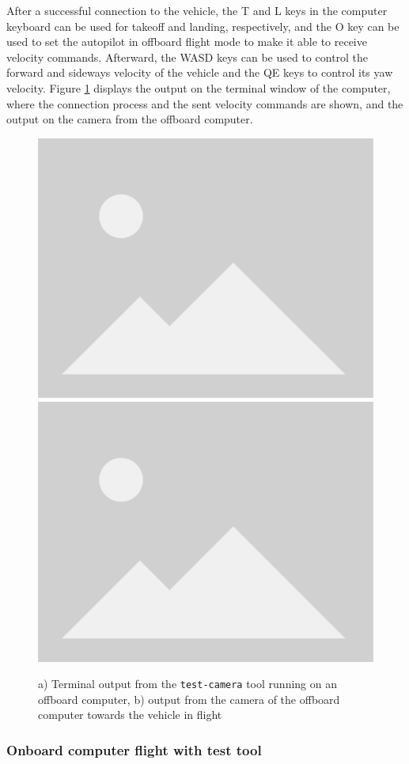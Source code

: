 After a successful connection to the vehicle, the T and L keys in the computer keyboard can be used for takeoff and landing, respectively, and the O key can be used to set the autopilot in offboard flight mode to make it able to receive velocity commands.
Afterward, the WASD keys can be used to control the forward and sideways velocity of the vehicle and the QE keys to control its yaw velocity.
Figure \ref{fig:flight-test-cam-offboard} displays the output on the terminal window of the computer, where the connection process and the sent velocity commands are shown, and the output on the camera from the offboard computer.

\begin{figure}
  \centering
  \includegraphics[width=.45\textwidth, keepaspectratio]{img/placeholder.png}
  \includegraphics[width=.45\textwidth, keepaspectratio]{img/placeholder.png}
  \caption{a) Terminal output from the \texttt{test-camera} tool running on an offboard computer, b) output from the camera of the offboard computer towards the vehicle in flight}
  \label{fig:flight-test-cam-offboard}
\end{figure}

\subsubsection{Onboard computer flight with test tool}
\label{subsec:fl-test-3}

